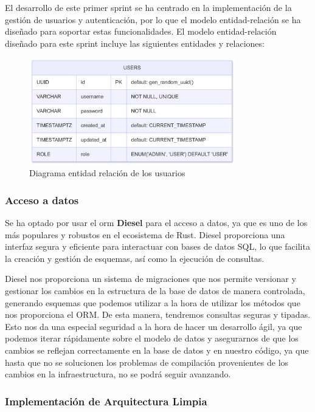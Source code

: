 El desarrollo de este primer sprint se ha centrado en la implementación de la gestión de usuarios y autenticación, por lo que el modelo entidad-relación se ha diseñado para soportar estas funcionalidades.
El modelo entidad-relación diseñado para este sprint incluye las siguientes entidades y relaciones:
\begin{figure}[H]
    \begin{center}
        \includegraphics[width=0.8\textwidth]{assets/sprint1/users-er-diagram.png}
    \end{center}
    \caption{Diagrama entidad relación de los usuarios}\label{fig:users-er-diagram}
\end{figure}


\subsubsection{Acceso a datos}
Se ha optado por usar el \acrshort{orm} \textbf{Diesel} para el acceso a datos, ya que es uno de los más populares y robustos en el ecosistema de Rust. Diesel proporciona una interfaz segura y eficiente para interactuar con bases de datos SQL, lo que facilita la creación y gestión de esquemas, así como la ejecución de consultas.

Diesel nos proporciona un sistema de migraciones que nos permite versionar y gestionar los cambios en la estructura de la base de datos de manera controlada, generando esquemas que podemos utilizar a la hora de utilizar los métodos que nos proporciona el ORM. De esta manera, tendremos consultas seguras y tipadas.
Esto nos da una especial seguridad a la hora de hacer un desarrollo ágil, ya que podemos iterar rápidamente sobre el modelo de datos y asegurarnos de que los cambios se reflejan correctamente en la base de datos y en nuestro código, ya que hasta que no se solucionen los problemas de compilación provenientes de los cambios en la infraestructura, no se podrá seguir avanzando.

\subsubsection{Implementación de Arquitectura Limpia}

